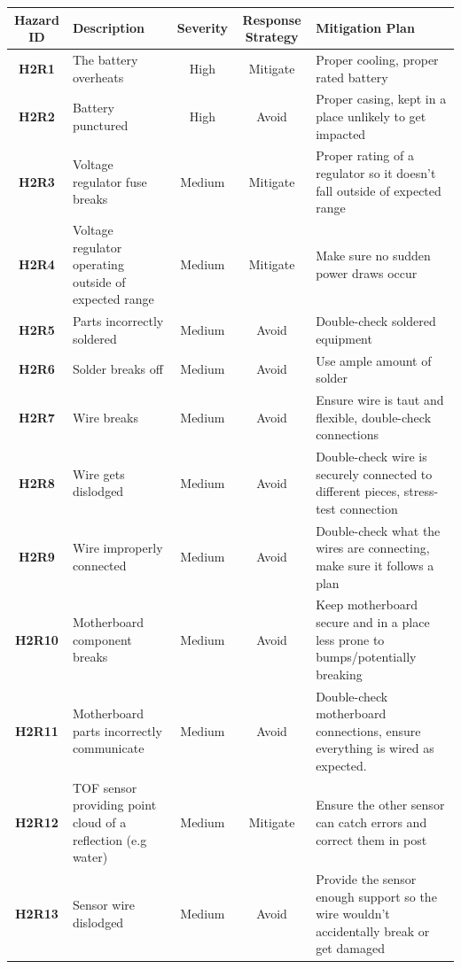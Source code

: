 \documentclass[11pt]{article}
\begin{document}
			\begin{tabularx}{\textwidth}{ c  p{}  c  c  X }
				\toprule
				\textbf{Hazard ID} & \textbf{Description} & \textbf{Severity} & \textbf{Response Strategy} & \textbf {Mitigation Plan} \\ 
				\hline 
				\textbf{H2R1} & The battery overheats & High & Mitigate & Proper cooling, proper rated battery \\  
				\hline
				\textbf{H2R2} & Battery punctured & High  & Avoid  & Proper casing, kept in a place unlikely to get impacted \\
				\hline
				\textbf{H2R3} & Voltage regulator fuse breaks & Medium & Mitigate  & Proper rating of a regulator so it doesn't fall outside of expected range \\ 
				\hline
				\textbf{H2R4} & Voltage regulator operating outside of expected range & Medium  & Mitigate  & Make sure no sudden power draws occur \\ 
				\hline
				\textbf{H2R5} & Parts incorrectly soldered & Medium  & Avoid  & Double-check soldered equipment \\ 
				\hline
				\textbf{H2R6} & Solder breaks off & Medium & Avoid  & Use ample amount of solder \\ 
				\hline
				\textbf{H2R7} & Wire breaks & Medium  & Avoid  & Ensure wire is taut and flexible, double-check connections \\ 
				\hline
				\textbf{H2R8} & Wire gets dislodged & Medium & Avoid  & Double-check wire is securely connected to different pieces, stress-test connection \\ 
				\hline
				\textbf{H2R9} & Wire improperly connected & Medium & Avoid  & Double-check what the wires are connecting, make sure it follows a plan \\ 
				\hline
				\textbf{H2R10} & Motherboard component breaks & Medium & Avoid  & Keep motherboard secure and in a place less prone to bumps/potentially breaking \\ 
				\hline
				\textbf{H2R11} & Motherboard parts incorrectly communicate & Medium  & Avoid  & Double-check motherboard connections, ensure everything is wired as expected. \\ 
				\hline
				\textbf{H2R12} & TOF sensor providing point cloud of a reflection (e.g water)  & Medium  & Mitigate  & Ensure the other sensor can catch errors and correct them in post \\ 
				\hline
				\textbf{H2R13} & Sensor wire dislodged & Medium  & Avoid  & Provide the sensor enough support so the wire wouldn't accidentally break or get damaged \\ 

\end{tabularx}
\end{document}
